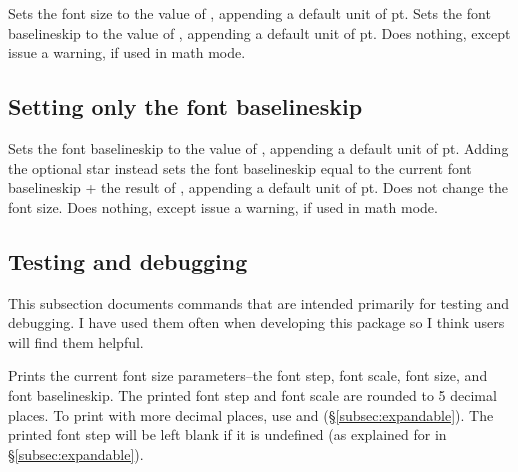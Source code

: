 \documentclass{beery}
\begin{document}
\begin{mydisplaycode}
    
\end{mydisplaycode}

Sets the font size to the value of , appending a default unit of \unit{pt}.
Sets the font baselineskip to the value of , appending a default unit of \unit{pt}.
Does nothing, except issue a warning, if used in math mode.

\subsection{Setting only the font baselineskip}
\label{subsec:setfontbaselineskip}

\begin{mydisplaycode}
   \sarg{} 
\end{mydisplaycode}

Sets the font baselineskip to the value of , appending a default unit of \unit{pt}.
Adding the optional star instead sets the font baselineskip equal to the current font baselineskip + the result of , appending a default unit of \unit{pt}.
Does not change the font size.
Does nothing, except issue a warning, if used in math mode.

\subsection{Testing and debugging}
\label{subsec:debug}

This subsection documents commands that are intended primarily for testing and debugging.
I have used them often when developing this package so I think users will find them helpful.

\begin{mydisplaycode}
\end{mydisplaycode}

Prints the current font size parameters\---the font step, font scale, font size, and font baselineskip.
The printed font step and font scale are rounded to \num{5} decimal places.
To print with more decimal places, use  and  (\S\ref{subsec:expandable}).
The printed font step will be left blank if it is undefined (as explained for  in \S\ref{subsec:expandable}).
\end{document}
